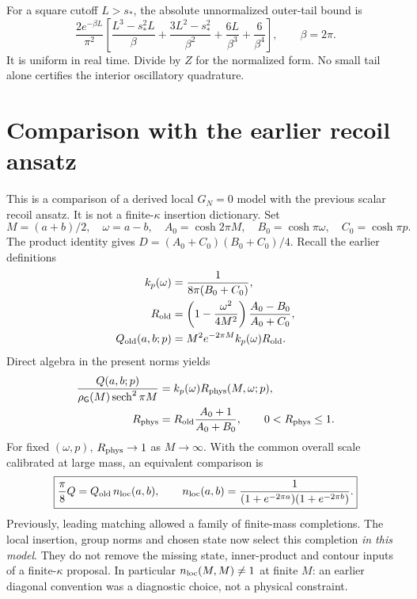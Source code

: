 \documentclass[11pt,a4paper]{article}
\newcommand{\sech}{\operatorname{sech}}
\begin{document}
For a square cutoff $L>s_*$, the absolute unnormalized outer-tail bound is
\begin{equation}
 \frac{2e^{-\beta L}}{\pi^2}
 \left[\frac{L^3-s_*^2L}{\beta}
       +\frac{3L^2-s_*^2}{\beta^2}+\frac{6L}{\beta^3}+\frac6{\beta^4}\right],
 \qquad \beta=2\pi .
\end{equation}
It is uniform in real time. Divide by $Z$ for the normalized form.
No small tail alone certifies the interior oscillatory quadrature.

\newpage
\section{Comparison with the earlier recoil ansatz}
This is a comparison of a derived local $G_N=0$ model with the previous
scalar recoil ansatz. It is not a finite-$\kappa$ insertion dictionary.
Set
\[
 M=(a+b)/2,\quad\omega=a-b,\quad
 A_0=\cosh2\pi M,\quad B_0=\cosh\pi\omega,\quad C_0=\cosh\pi p.
\]
The product identity gives $D=(A_0+C_0)(B_0+C_0)/4$.
Recall the earlier definitions
\begin{align}
 k_p(\omega)&=\frac1{8\pi(B_0+C_0)},\\
 R_{\rm old}&=\left(1-\frac{\omega^2}{4M^2}\right)
                   \frac{A_0-B_0}{A_0+C_0},\\
 Q_{\rm old}(a,b;p)&=M^2e^{-2\pi M}k_p(\omega)R_{\rm old}.
\end{align}
Direct algebra in the present norms yields
\begin{align}
 \frac{Q(a,b;p)}{\rho_{\mathsf G}(M)\sech^2\pi M}
       &=k_p(\omega)R_{\rm phys}(M,\omega;p),\\
 R_{\rm phys}&=R_{\rm old}\frac{A_0+1}{A_0+B_0},\qquad
                  0<R_{\rm phys}\le1 .
\end{align}
For fixed $(\omega,p)$, $R_{\rm phys}\to1$ as $M\to\infty$.
With the common overall scale calibrated at large mass, an equivalent
comparison is
\begin{equation}\boxed{
 \frac{\pi}{8}Q=Q_{\rm old}\,n_{\rm loc}(a,b),\qquad
 n_{\rm loc}(a,b)=
 \frac1{(1+e^{-2\pi a})(1+e^{-2\pi b})}.}
\end{equation}
Previously, leading matching allowed a family of finite-mass completions.
The local insertion, group norms and chosen state now select this completion
\emph{in this model}. They do not remove the missing state, inner-product
and contour inputs of a finite-$\kappa$ proposal. In particular
$n_{\rm loc}(M,M)\ne1$ at finite $M$: an earlier diagonal convention
was a diagnostic choice, not a physical constraint.
\end{document}
